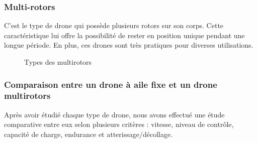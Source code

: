 \subsubsection{Multi-rotors}
C'est le type de drone qui possède plusieurs rotors sur son corps. Cette caractéristique lui offre la possibilité de rester en position unique pendant une longue période. En plus, ces drones sont très pratiques pour diverses utilisations.
\begin {figure}[H] 
\begin{center} 
	\centering
	\pagestyle{fancy}
	\hspace*{-0.5cm}
	
\end{center}

\caption{Types des multirotors}
\end{figure}
\subsubsection{Comparaison entre un drone à aile fixe  et un drone multirotors}
Après avoir étudié chaque type de drone, nous avons effectué une étude comparative entre eux selon plusieurs critères : vitesse, niveau de contrôle, capacité de charge, endurance et atterissage/décollage.

